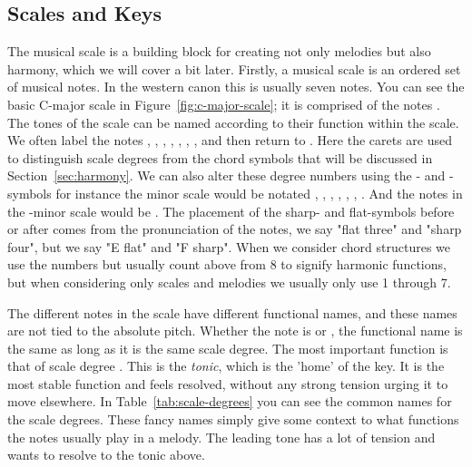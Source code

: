   \subsection{Scales and Keys}\label{sec:keys}
    The musical scale is a building block for creating not only melodies but also harmony, which we will cover a bit later.
    Firstly, a musical scale is an ordered set of musical notes. In the western canon this is usually seven notes. You can see the basic C-major scale in Figure~\ref{fig:c-major-scale}; it is comprised of the notes       . The tones of the scale can be named according to their function within the scale. We often label the notes , , , , , , , and then return to . Here the carets are used to distinguish scale degrees from the chord symbols that will be discussed in Section~\ref{sec:harmony}.
    We can also alter these degree numbers using the \musFlat- and \musSharp-symbols for instance the minor scale would be notated , , \musFlat{}, , , \musFlat{}, \musFlat{}. And the notes in the -minor scale would be       . The placement of the sharp- and flat-symbols before or after comes from the pronunciation of the notes, we say "flat three" and "sharp four", but we say "E flat" and "F sharp". 
    When we consider chord structures we use the numbers but usually count above from 8 to signify harmonic functions, but when considering only scales and melodies we usually only use 1 through 7.
    \newline

    The different notes in the scale have different functional names, and these names are not tied to the absolute pitch. Whether the note is  or , the functional name is the same as long as it is the same scale degree.
    \noindent The most important function is that of scale degree . This is the \textit{tonic}, which is the 'home' of the key. It is the most stable function and feels resolved, without any strong tension urging it to move elsewhere.
    In Table~\ref{tab:scale-degrees} you can see the common names for the scale degrees. These fancy names simply give some context to what functions the notes usually play in a melody. The leading tone has a lot of tension and wants to resolve to the tonic above.


